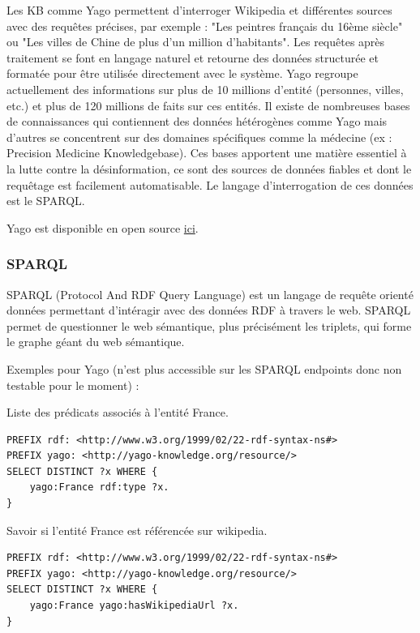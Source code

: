 Les KB comme Yago permettent d'interroger Wikipedia et différentes sources avec des requêtes précises, par exemple : "Les peintres français du 16ème siècle" ou "Les villes de Chine de plus d'un million d'habitants". Les requêtes après traitement se font en langage naturel et retourne des données structurée et formatée pour être utilisée directement avec le système. Yago regroupe actuellement des informations sur plus de 10 millions d'entité (personnes, villes, etc.) et plus de 120 millions de faits sur ces entités. 
Il existe de nombreuses bases de connaissances qui contiennent des données hétérogènes comme Yago mais d'autres se concentrent sur des domaines spécifiques comme la médecine (ex : Precision Medicine Knowledgebase). Ces bases apportent une matière essentiel à la lutte contre la désinformation, ce sont des sources de données fiables et dont le requêtage est facilement automatisable.
Le langage d'interrogation de ces données est le SPARQL.

Yago est disponible en open source \href{https://github.com/yago-naga/yago3}{ici}.

\iffalse
\subsubsection{SPARQL}

SPARQL (Protocol And RDF Query Language) est un langage de requête orienté données permettant d'intéragir avec des données RDF à travers le web. SPARQL permet de questionner le web sémantique, plus précisément les triplets, qui forme le graphe géant du web sémantique.

Exemples pour Yago (n'est plus accessible sur les SPARQL endpoints donc non testable pour le moment) :

Liste des prédicats associés à l'entité France.

\begin{lstlisting}[language=SPARQL, backgroundcolor=\color{lightgray}]
PREFIX rdf: <http://www.w3.org/1999/02/22-rdf-syntax-ns#> 
PREFIX yago: <http://yago-knowledge.org/resource/>
SELECT DISTINCT ?x WHERE {
    yago:France rdf:type ?x.
}
\end{lstlisting}

\iffalse
Savoir si l'entité France est référencée sur wikipedia.

\begin{lstlisting}[language=SPARQL, backgroundcolor=\color{lightgray}]
PREFIX rdf: <http://www.w3.org/1999/02/22-rdf-syntax-ns#> 
PREFIX yago: <http://yago-knowledge.org/resource/>
SELECT DISTINCT ?x WHERE {
    yago:France yago:hasWikipediaUrl ?x.
}
\end{lstlisting}

